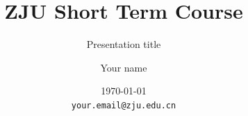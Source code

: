 \documentclass[aspectratio=169]{beamer}
\title{ZJU Short Term Course}
\subtitle{Presentation title}
\author{Your name}
\institute{Zhejiang University}
\date{\today\\\small\texttt{your.email@zju.edu.cn}}
\begin{document}
\begin{frame}
  \titlepage
\end{frame}


\end{document}
